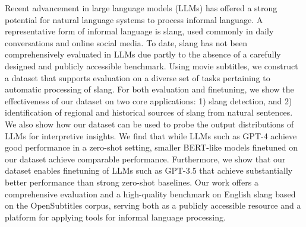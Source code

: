 Recent advancement in large language models (LLMs) has offered a strong potential for natural language systems to process informal language. A representative form of informal language is slang, used commonly in daily conversations and online social media. To date, slang has not been comprehensively evaluated in LLMs   due partly to the absence of a carefully designed and publicly accessible benchmark. Using movie subtitles, we construct a  dataset that supports evaluation on a diverse set of tasks pertaining to automatic processing of slang. For both evaluation and finetuning, we show the effectiveness of our dataset on two core applications: 1) slang detection, and 2) identification of regional and historical sources of slang from natural sentences. We also show how our dataset can be used to probe the output distributions of LLMs for interpretive insights. We find that while LLMs such as GPT-4 achieve good performance in a zero-shot setting, smaller BERT-like models finetuned on our dataset achieve comparable performance. Furthermore, we show that our dataset enables finetuning of LLMs such as GPT-3.5 that achieve substantially better performance than strong zero-shot baselines. Our work offers a comprehensive evaluation and a high-quality benchmark on English slang based on the OpenSubtitles corpus, serving both as a publicly accessible resource and a platform for applying tools for informal language processing.